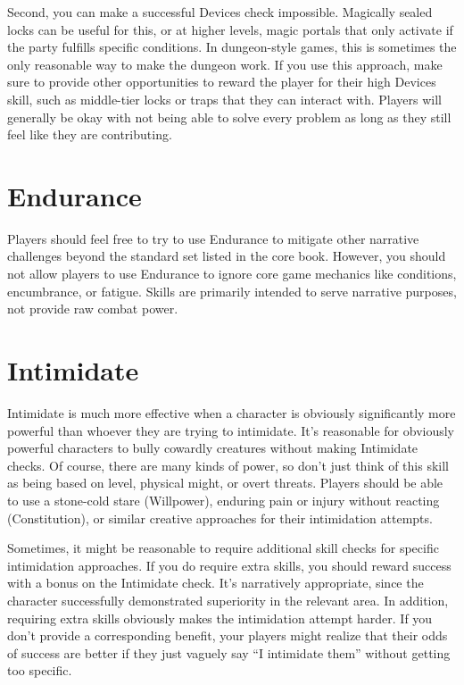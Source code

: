   Second, you can make a successful Devices check impossible.
  Magically sealed locks can be useful for this, or at higher levels, magic portals that only activate if the party fulfills specific conditions.
  In dungeon-style games, this is sometimes the only reasonable way to make the dungeon work.
  If you use this approach, make sure to provide other opportunities to reward the player for their high Devices skill, such as middle-tier locks or traps that they can interact with.
  Players will generally be okay with not being able to solve every problem as long as they still feel like they are contributing.

\section{Endurance}\label{Endurance}
  Players should feel free to try to use Endurance to mitigate other narrative challenges beyond the standard set listed in the core book.
  However, you should not allow players to use Endurance to ignore core game mechanics like conditions, encumbrance, or fatigue.
  Skills are primarily intended to serve narrative purposes, not provide raw combat power.

\section{Intimidate}\label{Intimidate}

  Intimidate is much more effective when a character is obviously significantly more powerful than whoever they are trying to intimidate.
  It's reasonable for obviously powerful characters to bully cowardly creatures without making Intimidate checks.
  Of course, there are many kinds of power, so don't just think of this skill as being based on level, physical might, or overt threats.
  Players should be able to use a stone-cold stare (Willpower), enduring pain or injury without reacting (Constitution), or similar creative approaches for their intimidation attempts.

  Sometimes, it might be reasonable to require additional skill checks for specific intimidation approaches.
  If you do require extra skills, you should reward success with a bonus on the Intimidate check.
  It's narratively appropriate, since the character successfully demonstrated superiority in the relevant area.
  In addition, requiring extra skills obviously makes the intimidation attempt harder.
  If you don't provide a corresponding benefit, your players might realize that their odds of success are better if they just vaguely say ``I intimidate them'' without getting too specific.

